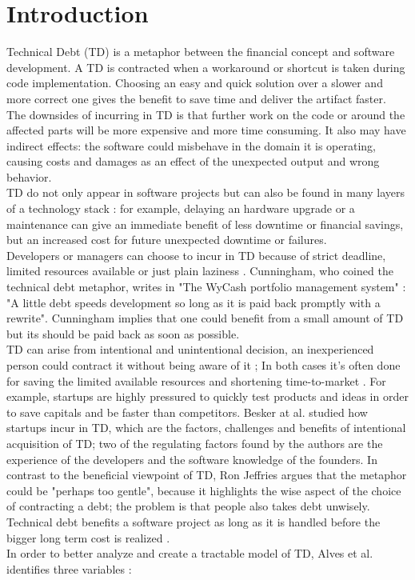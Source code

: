 \chapter{Introduction}
Technical Debt (TD) is a metaphor between the financial concept and software development.
A TD is contracted when a workaround or shortcut is taken during code implementation.
Choosing an easy and quick solution over a slower and more correct one gives the benefit to save time and deliver the artifact faster. 
\\
The downsides of incurring in TD is that further work on the code or around the affected parts will be more expensive and more time consuming. It also may have indirect effects: the software could misbehave in the domain it is operating, causing costs and damages as an effect of the unexpected output and wrong behavior.
\\
TD do not only appear in software projects but can also be found in many layers of a technology stack \cite{allman2012managing}: for example, delaying an hardware upgrade or a maintenance can give an immediate benefit of less downtime or financial savings, but an increased cost for future unexpected downtime or failures.
\\
Developers or managers can choose to incur in TD because of strict deadline, limited resources available or just plain laziness \cite{hinsen2015technical,allman2012managing}. Cunningham, who coined the technical debt metaphor, writes in "The WyCash portfolio management system" \cite{cunningham1992wycash}: "A little debt speeds development so long as it is paid back promptly with a rewrite". Cunningham implies that one could benefit from a small amount of TD but its should be paid back as soon as possible. 
\\
TD can arise from intentional and unintentional decision, an inexperienced person could contract it without being aware of it \cite{hinsen2015technical}; In both cases it's often done for saving the limited available resources and shortening time-to-market \cite{tom2012consolidated}. For example, startups are highly pressured to quickly test products and ideas in order to save capitals and be faster than competitors.
Besker at al. \cite{besker2018embracing} studied how startups incur in TD, which are the factors, challenges and benefits of intentional acquisition of TD; two of the regulating factors found by the authors are the experience of the developers and the software knowledge of the founders. In contrast to the beneficial viewpoint of TD, Ron Jeffries argues that the metaphor could be "perhaps too gentle", because it highlights the wise aspect of the choice of contracting a debt; the problem is that people also takes debt unwisely.
Technical debt benefits a software project as long as it is handled before the bigger long term cost is realized \cite{guo2016exploring}.
\\
In order to better analyze and create a tractable model of TD, Alves et al. identifies three variables \cite{martini2018technical}: 


